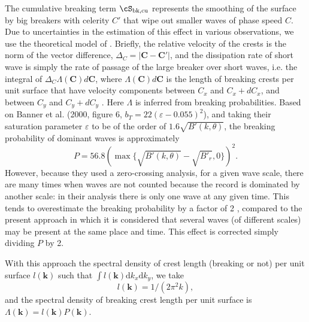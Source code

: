 The cumulative breaking term $\cS_{\mathrm{bk,cu}}$ represents the smoothing
of the surface by big breakers with celerity $C'$ that wipe out smaller waves
of phase speed $C$. Due to uncertainties in the estimation of this effect in
various observations, we use the theoretical model of
\cite{art:Aea09}. Briefly, the relative velocity of the crests is the norm of
the vector difference, $\Delta_C =\left|\mathbf{C}-\mathbf{C}'\right|$, and
the dissipation rate of short wave is simply the rate of passage of the large
breaker over short waves, i.e. the integral of $\Delta_C \Lambda(\mathbf{C})
d\mathbf{C}$, where $\Lambda (\mathbf{C}) d\mathbf{C}$ is the length of
breaking crests per unit surface that have velocity components between $C_x$
and $C_x+dC_x$, and between $C_y$ and $C_y+dC_y$ \citep{art:Phi85}.  Here
$\Lambda$ is inferred from breaking probabilities. Based on Banner et
al. (2000, figure 6, $b_T=22
\left(\varepsilon-0.055\right)^2$)\nocite{art:BBY00}, and taking their
saturation parameter $\varepsilon$ to be of the order of $1.6
\sqrt{B'(k,\theta)}$, the breaking probability of dominant waves is
approximately
\begin{equation}
P=56.8\left(\max\{\sqrt{B'(k,\theta)}-\sqrt{B'_r},0\}\right)^2.\label{PBanner}
\end{equation}
However, because they used a zero-crossing analysis, for a given wave scale,
there are many times when waves are not counted because the record is
dominated by another scale: in their analysis there is only one wave at any
given time.  This tends to overestimate the breaking probability by a factor
of 2 \citep{art:FAB10}, compared to the present approach in which it is 
considered that several waves (of different scales) may be present at the same place and
time. This effect is corrected simply dividing $P$ by 2.


With this approach the spectral density of crest length (breaking or not) per
unit surface $l(\mathbf{k})$ such that $\int l(\mathbf{k}) \mathrm{d}k_x
\mathrm{d}k_y$, we take
\begin{equation}
l(\mathbf{k})= 1/(2\pi^2 k),
\end{equation}
and the spectral density of breaking crest length per unit surface is
$\Lambda(\mathbf{k})=l(\mathbf{k})P(\mathbf{k})$.  


